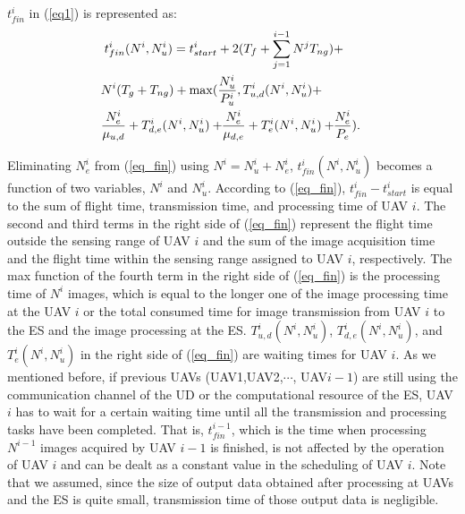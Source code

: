 \documentclass{ieeeaccess}
\begin{document}
$t_{fin}^i$ in (\ref{eq1}) is represented as:
\begin{align}
&t_{fin}^i(N^i,N_u^i)=t_{start}^i+2(T_f+\sum_{j=1}^{i-1}{{N^j}T_{ng}})+\nonumber\\
&\hspace{-1mm}N^i({T_g+T_{ng}})+\max(\frac{N_u^i}{P_u^i},T_{u,d}^{i}(N^i,N_u^i)+\nonumber\\
&\hspace{-1mm}\frac{N_e^i}{\mu_{u,d}}+T_{d,e}^{i}(N^i,N_u^i)+\hspace{-1mm}\frac{N_e^i}{\mu_{d,e}}+T_{e}^{i}(N^i,N_u^i)+\hspace{-1mm}\frac{N_e^i}{P_e}). \label{eq_fin}
\end{align}

Eliminating $N_e^i$ from (\ref{eq_fin}) using $N^i=N_u^i+N_e^i$, $t_{fin}^i(N^i,N_u^i)$ becomes a function of two variables, $N^i$ and $N_u^i$.
%
According to (\ref{eq_fin}), $t_{fin}^i-t_{start}^i$ is equal to the sum of flight time, transmission time, and processing time of UAV $i$.
%
The second and third terms in the right side of (\ref{eq_fin}) represent the flight time outside the sensing range of UAV $i$ and the sum of the image acquisition time and the flight time within the sensing range assigned to UAV $i$, respectively.
%
The max function of the fourth term in the right side of (\ref{eq_fin}) is the processing time of $N^i$ images, which is equal to the longer one of the image processing time at the UAV $i$ or the total consumed time for image transmission from UAV $i$ to the ES and the image processing at the ES.
%
$T_{u,d}^{i}(N^i,N_u^i)$, $T_{d,e}^{i}(N^i,N_u^i)$, and $T_e^{i}(N^i,N_u^i)$ in the right side of (\ref{eq_fin}) are waiting times for UAV $i$.
%
As we mentioned before, if previous UAVs (UAV1,UAV2,$\cdots$, UAV${i-1}$) are still using the communication channel of the UD or the computational resource of the ES, UAV $i$ has to wait for a certain waiting time until all the transmission and processing tasks have been completed.
%
That is, $t_{fin}^{i-1}$, which is the time when processing $N^{i-1}$ images acquired by UAV $i-1$ is finished, is not affected by the operation of UAV $i$ and can be dealt as a constant value in the scheduling of UAV $i$.
%
Note that we assumed, since the size of output data obtained after processing at UAVs and the ES is quite small, transmission time of those output data is negligible.
\end{document}
